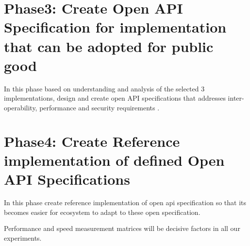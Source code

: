 \section{Phase3: Create Open API Specification for implementation that can be adopted for public good}
In this phase based on understanding and analysis of the selected 3 implementations, design and create open API specifications that addresses inter-operability, performance and security requirements .

\section{Phase4: Create Reference implementation of defined Open API Specifications}
In this phase create reference implementation of open api specification so that its becomes easier for ecosystem to adapt to these open specification.

Performance and speed measurement matrices will be decisive factors in all our experiments. 

